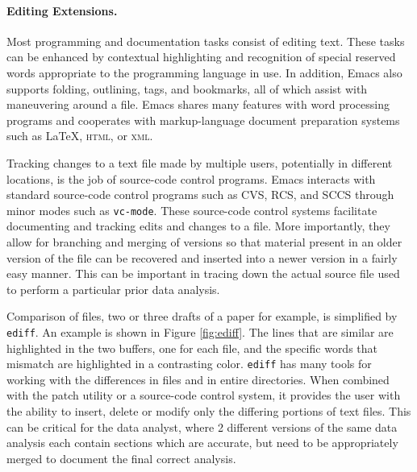 \documentclass{article}
\newcommand{\stexttt}[1]{{\small\texttt{#1}}}
\begin{document}


\paragraph{Editing Extensions.}
Most programming and documentation tasks consist of editing text.
These tasks can be enhanced by contextual highlighting and recognition
of special reserved words appropriate to the programming language in
use.  In addition, Emacs also supports folding, outlining, tags, and
bookmarks, all of which assist with maneuvering around a file.  Emacs
shares many features with word processing programs and cooperates with
markup-language document preparation systems such as \LaTeX,
\textsc{html}, or \textsc{xml}.

Tracking changes to a text file made by multiple users, potentially in
different locations, is the job of source-code control programs.
Emacs interacts with standard source-code control programs such as
CVS, RCS, and SCCS through minor modes such as \stexttt{vc-mode}.
These source-code control systems facilitate documenting and tracking
edits and changes to a file.  More importantly, they allow for
branching and merging of versions so that material present in an older
version of the file can be recovered and inserted into a newer version
in a fairly easy manner.  This can be important in tracing down the
actual source file used to perform a particular prior data analysis.

Comparison of files, two or three drafts of a paper for example, is
simplified by \stexttt{ediff}.  An example is shown in Figure
\ref{fig:ediff}.  The lines that are similar are highlighted in the two
buffers, one for each file, and the specific words that mismatch are
highlighted in a contrasting color.  \stexttt{ediff} has many tools
for working with the differences in files and in entire directories.
When combined with the patch utility or a source-code control system,
it provides the user with the ability to insert, delete or modify only
the differing portions of text files.  This can be critical for the
data analyst, where 2 different versions of the same data analysis
each contain sections which are accurate, but need to be appropriately
merged to document the final correct analysis.
\end{document}
